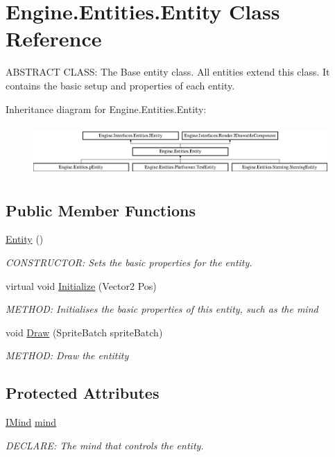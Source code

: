 \hypertarget{a00314}{}\section{Engine.\+Entities.\+Entity Class Reference}
\label{a00314}


A\+B\+S\+T\+R\+A\+CT C\+L\+A\+SS\+: The Base entity class. All entities extend this class. It contains the basic setup and properties of each entity.  


Inheritance diagram for Engine.\+Entities.\+Entity\+:\begin{figure}[H]
\begin{center}
\leavevmode
\includegraphics[height=1.944444cm]{d0/d39/a00314}
\end{center}
\end{figure}
\subsection*{Public Member Functions}
\begin{DoxyCompactItemize}
\item 
\hyperlink{a00314_a5a3cc22ef87965c27e86f8b0867550cf}{Entity} ()
\begin{DoxyCompactList}\small\item\em C\+O\+N\+S\+T\+R\+U\+C\+T\+OR\+: Sets the basic properties for the entity. \end{DoxyCompactList}\item 
virtual void \hyperlink{a00314_aa1425aeeac379c5141e7560b84850b3d}{Initialize} (Vector2 Pos)
\begin{DoxyCompactList}\small\item\em M\+E\+T\+H\+OD\+: Initialises the basic properties of this entity, such as the mind \end{DoxyCompactList}\item 
void \hyperlink{a00314_a5c795930028c5672b54f95369b25019f}{Draw} (Sprite\+Batch sprite\+Batch)
\begin{DoxyCompactList}\small\item\em M\+E\+T\+H\+OD\+: Draw the entitity \end{DoxyCompactList}\end{DoxyCompactItemize}
\subsection*{Protected Attributes}
\begin{DoxyCompactItemize}
\item 
\hyperlink{a00446}{I\+Mind} \hyperlink{a00314_a8ba8155440726f55d5e087eeecf0d12f}{mind}
\begin{DoxyCompactList}\small\item\em D\+E\+C\+L\+A\+RE\+: The mind that controls the entity. \end{DoxyCompactList}\end{DoxyCompactItemize}
